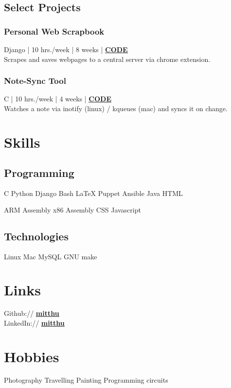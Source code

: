\documentclass[]{deedy}
\newcommand{\linkstyle}[1]{\textbf{\ul{#1}}}
\let\oldhref\href
\renewcommand{\href}[2]{%
\oldhref{#1}{\linkstyle{#2}}%
}
\begin{document}
\begin{minipage}[t]{0.33\textwidth}
\subsection{Select Projects}
\subsubsection*{Personal Web Scrapbook}
{\small Django | 10 hrs./week | 8 weeks | \href{https://bitbucket.org/mitthu/capsule/src/}{CODE}}\\[1ex]
Scrapes and saves webpages to a central server via chrome extension.\\[1.5ex]

\subsubsection*{Note-Sync Tool}
{\small C | 10 hrs./week | 4 weeks | \href{https://github.com/mitthu/note-sync}{CODE}}\\[1ex]
Watches a note via inotify (linux) / kqueues (mac) and syncs it on change.

\section{Skills}
\subsection{Programming}
C \textbullet{} Python \textbullet{} Django \textbullet{} Bash \textbullet{} \LaTeX \textbullet{} Puppet \textbullet{} Ansible \textbullet{} Java \textbullet{} HTML
\sectionsep

ARM Assembly \textbullet{} x86 Assembly \textbullet{} CSS \textbullet{} Javascript
\sectionsep

\subsection{Technologies}
Linux \textbullet{} Mac \textbullet{} MySQL \textbullet{} GNU make

\section{Links} 
Github:// \href{https://github.com/mitthu}{mitthu} \\
LinkedIn://  \href{https://www.linkedin.com/in/mitthu}{mitthu}

\section{Hobbies}
Photography \textbullet{} Travelling \textbullet{} Painting \textbullet{} Programming circuits

\end{minipage} \hfill
\end{document}
